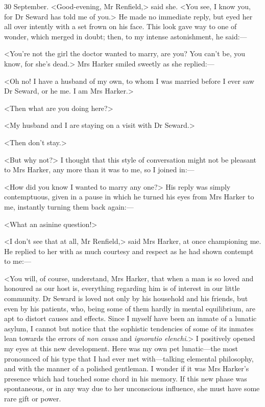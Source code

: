 \begin{diary}{30 September.}
<Good-evening, Mr Renfield,> said she. <You see, I know you, for Dr Seward has told me of you.> He made no immediate reply, but eyed her all over intently with a set frown on his face. This look gave way to one of wonder, which merged in doubt; then, to my intense astonishment, he said:—

<You're not the girl the doctor wanted to marry, are you? You can't be, you know, for she's dead.> Mrs Harker smiled sweetly as she replied:—

<Oh no! I have a husband of my own, to whom I was married before I ever saw Dr Seward, or he me. I am Mrs Harker.>

<Then what are you doing here?>

<My husband and I are staying on a visit with Dr Seward.>

<Then don't stay.>

<But why not?> I thought that this style of conversation might not be pleasant to Mrs Harker, any more than it was to me, so I joined in:—

<How did you know I wanted to marry any one?> His reply was simply contemptuous, given in a pause in which he turned his eyes from Mrs Harker to me, instantly turning them back again:—

<What an asinine question!>

<I don't see that at all, Mr Renfield,> said Mrs Harker, at once championing me. He replied to her with as much courtesy and respect as he had shown contempt to me:—

<You will, of course, understand, Mrs Harker, that when a man is so loved and honoured as our host is, everything regarding him is of interest in our little community. Dr Seward is loved not only by his household and his friends, but even by his patients, who, being some of them hardly in mental equilibrium, are apt to distort causes and effects. Since I myself have been an inmate of a lunatic asylum, I cannot but notice that the sophistic tendencies of some of its inmates lean towards the errors of \textit{non causa} and \textit{ignoratio elenchi}.> I positively opened my eyes at this new development. Here was my own pet lunatic—the most pronounced of his type that I had ever met with—talking elemental philosophy, and with the manner of a polished gentleman. I wonder if it was Mrs Harker's presence which had touched some chord in his memory. If this new phase was spontaneous, or in any way due to her unconscious influence, she must have some rare gift or power.


\end{diary}
